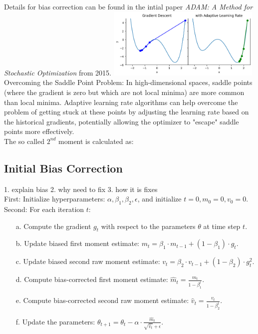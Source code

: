 \documentclass[journal]{IEEEtran}
\begin{document}
Details for bias correction can be found in the intial paper \textit{ADAM: A Method for Stochastic Optimization} from 2015.
\includegraphics[width=0.55\textwidth]{report/figures/GD_adap.png}\\

Overcoming the Saddle Point Problem: In high-dimensional spaces, saddle points (where the gradient is zero but which are not local minima) are more common than local minima. Adaptive learning rate algorithms can help overcome the problem of getting stuck at these points by adjusting the learning rate based on the historical gradients, potentially allowing the optimizer to "escape" saddle points more effectively.\\
The so called $2^{nd}$ moment is calculated as:





\subsection{Initial Bias Correction}
1. explain bias
2. why need to fix
3. how it is fixes\\
First: Initialize hyperparameters: \(\alpha, \beta_1, \beta_2, \epsilon\), and initialize \(t=0, m_0 = 0, v_0 = 0\).\\
Second: For each iteration \(t\):
\begin{itemize}
 \item[a.] Compute the gradient \(g_t\) with respect to the parameters \(\theta\) at time step \(t\).
 \item[b.] Update biased first moment estimate: \(m_t = \beta_1 \cdot m_{t-1} + (1 - \beta_1) \cdot g_t\).
 \item[c.] Update biased second raw moment estimate: \(v_t = \beta_2 \cdot v_{t-1} + (1 - \beta_2) \cdot g_t^2\).
 \item[d.] Compute bias-corrected first moment estimate: \(\hat{m}_t = \frac{m_t}{1 - \beta_1^t}\).
 \item[e.] Compute bias-corrected second raw moment estimate: \(\hat{v}_t = \frac{v_t}{1 - \beta_2^t}\).
 \item[f.] Update the parameters: \(\theta_{t+1} = \theta_t - \alpha \cdot \frac{\hat{m}_t}{\sqrt{\hat{v}_t} + \epsilon}\).
\end{itemize}
\end{document}
